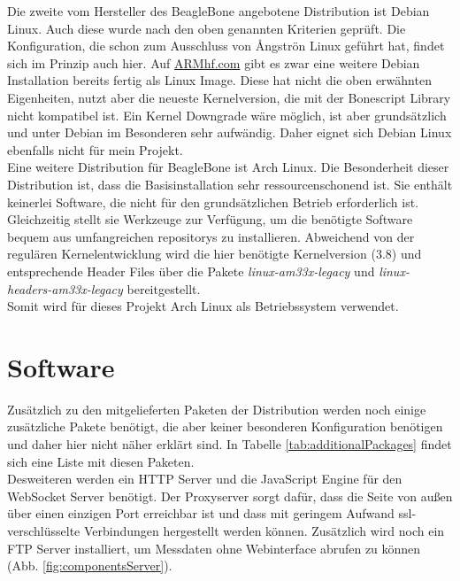 Die zweite vom Hersteller des BeagleBone angebotene Distribution ist Debian Linux. Auch diese wurde nach den oben genannten Kriterien geprüft. Die Konfiguration, die schon zum Ausschluss von {\AA}ngströn Linux geführt hat, findet sich im Prinzip auch hier. Auf \href{http://www.armhf.com/}{ARMhf.com} gibt es zwar eine weitere Debian Installation bereits fertig als Linux Image. Diese hat nicht die oben erwähnten Eigenheiten, nutzt aber die neueste Kernelversion, die mit der Bonescript Library nicht kompatibel ist. Ein Kernel Downgrade wäre möglich, ist aber grundsätzlich und unter Debian im Besonderen sehr aufwändig. Daher eignet sich Debian Linux ebenfalls nicht für mein Projekt.\\

Eine weitere Distribution für BeagleBone ist Arch Linux. Die Besonderheit dieser Distribution ist, dass die Basisinstallation sehr ressourcenschonend ist. Sie enthält keinerlei Software, die nicht für den grundsätzlichen Betrieb erforderlich ist. Gleichzeitig stellt sie Werkzeuge zur Verfügung, um die benötigte Software bequem aus umfangreichen \glspl{repository} zu installieren. Abweichend von der regulären Kernelentwicklung wird die hier benötigte Kernelversion (3.8) und entsprechende Header Files über die Pakete \textit{linux-am33x-legacy} und \textit{linux-headers-am33x-legacy} bereitgestellt.\\

Somit wird für dieses Projekt Arch Linux als Betriebssystem verwendet.


\section{Software}

Zusätzlich zu den mitgelieferten Paketen der Distribution werden noch einige zusätzliche Pakete benötigt, die aber keiner besonderen Konfiguration benötigen und daher hier nicht näher erklärt sind. In Tabelle \ref{tab:additionalPackages} findet sich eine Liste mit diesen Paketen.\\

Desweiteren werden ein HTTP Server und die JavaScript Engine für den WebSocket Server benötigt. Der Proxyserver sorgt dafür, dass die Seite von außen über einen einzigen Port erreichbar ist und dass mit geringem Aufwand \gls{ssl}-verschlüsselte Verbindungen hergestellt werden können. Zusätzlich wird noch ein FTP Server installiert, um Messdaten ohne Webinterface abrufen zu können (Abb. \ref{fig:componentsServer}).

